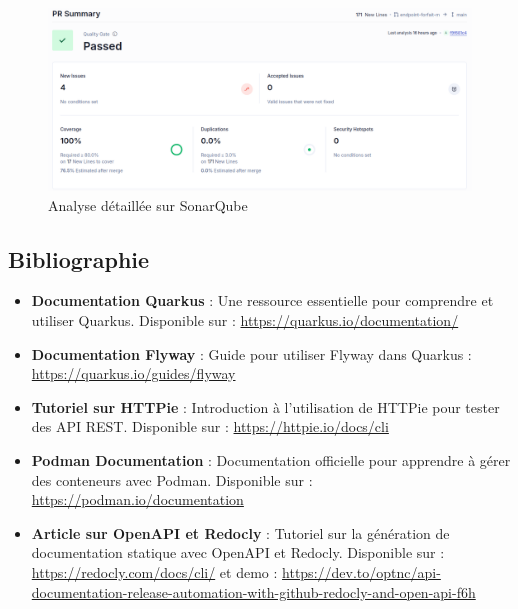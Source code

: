 \documentclass{article}
\begin{document}
	\begin{figure}[H] \centering \includegraphics[width=\textwidth]{asset/analyse_sonarq.png} \caption{Analyse détaillée sur SonarQube} \label{fig:sonarq}\end{figure}
	\subsection{Bibliographie}
	\begin{itemize}
		\item \textbf{Documentation Quarkus} : Une ressource essentielle pour comprendre et utiliser Quarkus. Disponible sur : \url{https://quarkus.io/documentation/}
		\item \textbf{Documentation Flyway} : Guide pour utiliser Flyway dans Quarkus : \url{https://quarkus.io/guides/flyway}
		\item \textbf{Tutoriel sur HTTPie} : Introduction à l'utilisation de HTTPie pour tester des API REST. Disponible sur : \url{https://httpie.io/docs/cli}
		\item \textbf{Podman Documentation} : Documentation officielle pour apprendre à gérer des conteneurs avec Podman. Disponible sur : \url{https://podman.io/documentation}
		\item \textbf{Article sur OpenAPI et Redocly} : Tutoriel sur la génération de documentation statique avec OpenAPI et Redocly. Disponible sur : \url{https://redocly.com/docs/cli/} et demo : \url{https://dev.to/optnc/api-documentation-release-automation-with-github-redocly-and-open-api-f6h}
	\end{itemize}
	
\end{document}
